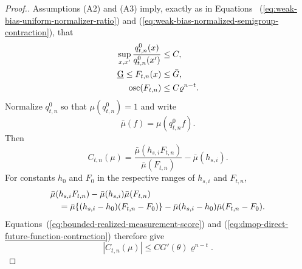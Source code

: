 \documentclass[11pt]{article}
\newcommand\refAssumpBoundedProcess{(A2)} %
\newcommand\refAssumpBoundedMeasurement{(A3)} %
\theoremstyle{thmstylethree}%
\begin{document}
\begin{proof}[Proof.]
Assumptions {\refAssumpBoundedProcess} and
{\refAssumpBoundedMeasurement} imply, exactly as in Equations~
(\ref{eq:weak-bias-uniform-normalizer-ratio}) and
(\ref{eq:weak-bias-normalized-semigroup-contraction}), that
\begin{align}
\sup_{x,x'}\frac{q_{t,n}^{0}(x)}{q_{t,n}^{0}(x')}
&\leq C,                                                     \notag\\
\underbar G\leq F_{t,n}(x)&\leq\bar G,                    \notag\\
\operatorname{osc}(F_{t,n})
&\leq C\varrho^{n-t}.
\label{eq:dmop-direct-future-function-contraction}
\end{align}
Normalize $q_{t,n}^{0}$ so that $\mu(q_{t,n}^{0})=1$ and write
\begin{equation}
\bar\mu(f)=\mu(q_{t,n}^{0}f).
\end{equation}
Then
\begin{equation}
C_{t,n}(\mu)
=
\frac{\bar\mu(h_{s,i}F_{t,n})}{\bar\mu(F_{t,n})}
-\bar\mu(h_{s,i}).
\label{eq:dmop-direct-continuation-covariance-form}
\end{equation}
For constants $h_0$ and $F_0$ in the respective ranges of $h_{s,i}$
and $F_{t,n}$,
\begin{align}
&\bar\mu(h_{s,i}F_{t,n})
-\bar\mu(h_{s,i})\bar\mu(F_{t,n})                         \notag\\
&\quad=
\bar\mu\{(h_{s,i}-h_0)(F_{t,n}-F_0)\}
-\bar\mu(h_{s,i}-h_0)\bar\mu(F_{t,n}-F_0).
\label{eq:dmop-direct-local-covariance-identity}
\end{align}
Equations~(\ref{eq:bounded-realized-measurement-score}) and
(\ref{eq:dmop-direct-future-function-contraction}) therefore give
\begin{equation}
|C_{t,n}(\mu)|
\leq
CG'(\theta)\varrho^{n-t}.
\label{eq:dmop-direct-local-continuation-size}
\end{equation}


\end{proof}
\end{document}
